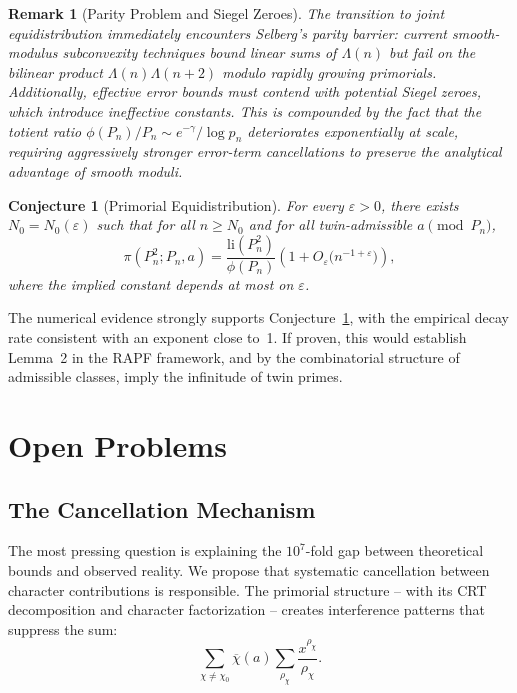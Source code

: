 \documentclass[11pt]{article}
\newtheorem{conjecture}{Conjecture}
\newtheorem{remark}{Remark}
\begin{document}
\begin{remark}[Parity Problem and Siegel Zeroes]
The transition to joint equidistribution immediately encounters
Selberg's parity barrier: current smooth-modulus subconvexity techniques
bound linear sums of $\Lambda(n)$ but fail on the bilinear product
$\Lambda(n)\Lambda(n+2)$ modulo rapidly growing primorials. Additionally,
effective error bounds must contend with potential Siegel zeroes, which
introduce ineffective constants. This is compounded by the fact that the
totient ratio $\phi(P_n)/P_n \sim e^{-\gamma}/\log p_n$ deteriorates
exponentially at scale, requiring aggressively stronger error-term
cancellations to preserve the analytical advantage of smooth moduli.

\end{remark}

\begin{conjecture}[Primorial Equidistribution]\label{conj:equidist}
For every $\varepsilon > 0$, there exists $N_0 = N_0(\varepsilon)$ such
that for all $n \geq N_0$ and for all twin-admissible $a \pmod{P_n}$,
\begin{equation}
\pi(P_n^2; P_n, a) = \frac{\mathrm{li}(P_n^2)}{\phi(P_n)}
\left(1 + O_\varepsilon\bigl(n^{-1+\varepsilon}\bigr)\right),
\end{equation}
where the implied constant depends at most on $\varepsilon$.
\end{conjecture}

The numerical evidence strongly supports Conjecture~\ref{conj:equidist},
with the empirical decay rate consistent with an exponent close to~1. If proven, this would establish Lemma~2 in the RAPF
framework, and by the combinatorial structure of admissible classes,
imply the infinitude of twin primes.

\section{Open Problems}

\subsection{The Cancellation Mechanism}

The most pressing question is explaining the $10^7$-fold gap between
theoretical bounds and observed reality. We propose that systematic
cancellation between character contributions is responsible. The primorial
structure -- with its CRT decomposition and character factorization --
creates interference patterns that suppress the sum:
\begin{equation}
\sum_{\chi \neq \chi_0} \overline{\chi}(a) \sum_{\rho_\chi}
\frac{x^{\rho_\chi}}{\rho_\chi}.
\end{equation}
\end{document}
